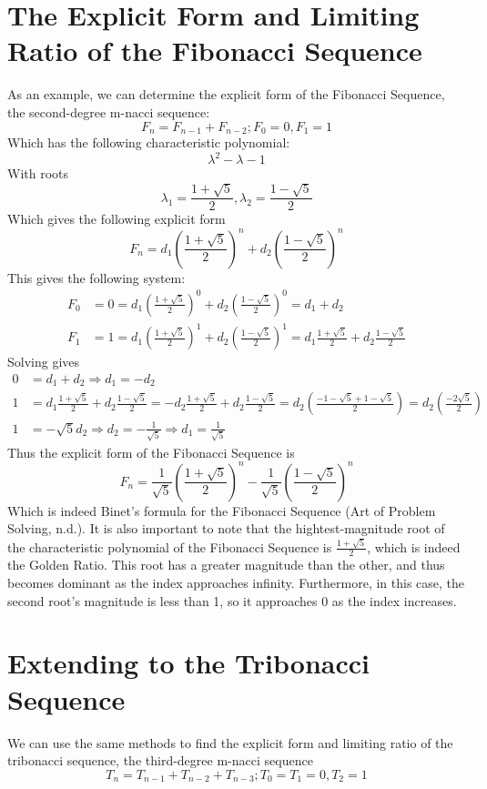 \documentclass[11pt]{article}
\begin{document}
\section{The Explicit Form and Limiting Ratio of the Fibonacci Sequence}
As an example, we can determine the explicit form of the Fibonacci Sequence, the second-degree m-nacci sequence:
$$F_n=F_{n-1}+F_{n-2}; F_0=0, F_1=1$$
Which has the following characteristic polynomial:
$$\lambda^2-\lambda-1$$
With roots
$$\lambda_1=\frac{1+\sqrt{5}}{2},\lambda_2=\frac{1-\sqrt{5}}{2}$$
Which gives the following explicit form
$$F_n=d_1\left(\frac{1+\sqrt{5}}{2}\right)^n+d_2\left(\frac{1-\sqrt{5}}{2}\right)^n$$
This gives the following system:
\begin{align*}
    F_0&=0=d_1\left(\frac{1+\sqrt{5}}{2}\right)^0+d_2\left(\frac{1-\sqrt{5}}{2}\right)^0 = d_1+d_2 \\
    F_1&=1=d_1\left(\frac{1+\sqrt{5}}{2}\right)^1+d_2\left(\frac{1-\sqrt{5}}{2}\right)^1 = d_1\frac{1+\sqrt{5}}{2}+d_2\frac{1-\sqrt{5}}{2}
\end{align*}
Solving gives 
\begin{align*}
    0 &= d_1+d_2 \Rightarrow d_1=-d_2\\
    1 &= d_1\frac{1+\sqrt{5}}{2}+d_2\frac{1-\sqrt{5}}{2} = -d_2\frac{1+\sqrt{5}}{2}+d_2\frac{1-\sqrt{5}}{2}= d_2\left(\frac{-1-\sqrt{5}+1-\sqrt{5}}{2}\right)= d_2\left(\frac{-2\sqrt{5}}{2}\right) \\
    1 &= -\sqrt{5}d_2\Rightarrow d_2=-\frac{1}{\sqrt{5}} \Rightarrow d_1=\frac{1}{\sqrt{5}}
\end{align*}
Thus the explicit form of the Fibonacci Sequence is
$$F_n=\frac{1}{\sqrt{5}}\left(\frac{1+\sqrt{5}}{2}\right)^n-\frac{1}{\sqrt{5}}\left(\frac{1-\sqrt{5}}{2}\right)^n$$
Which is indeed Binet's formula for the Fibonacci Sequence (Art of Problem Solving, n.d.).
It is also important to note that the hightest-magnitude root of the characteristic polynomial of the Fibonacci Sequence is $\frac{1+\sqrt{5}}{2}$, which is indeed the Golden Ratio. This root has a greater magnitude than the other, and thus becomes dominant as the index approaches infinity. Furthermore, in this case, the second root's magnitude is less than 1, so it approaches 0 as the index increases.  

\section{Extending to the Tribonacci Sequence}
We can use the same methods to find the explicit form and limiting ratio of the tribonacci sequence, the third-degree m-nacci sequence
$$T_n=T_{n-1}+T_{n-2}+T_{n-3};T_0=T_1=0, T_2=1$$
\end{document}
